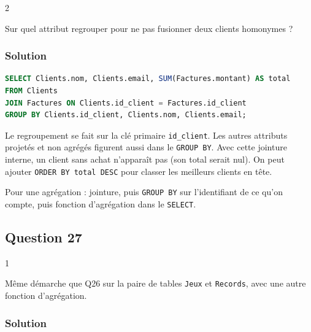 \documentclass[11pt,a4paper]{article}
\begin{document}
\begin{indication}{2}

Sur quel attribut regrouper pour ne pas fusionner deux clients homonymes ?

\end{indication}

\hypertarget{solution-25}{%
\subsubsection{Solution}\label{solution-25}}

\begin{lstlisting}[language=SQL]
SELECT Clients.nom, Clients.email, SUM(Factures.montant) AS total
FROM Clients
JOIN Factures ON Clients.id_client = Factures.id_client
GROUP BY Clients.id_client, Clients.nom, Clients.email;
\end{lstlisting}

Le regroupement se fait sur la clé primaire \texttt{id\_client}. Les autres attributs projetés et non agrégés figurent aussi dans le \texttt{GROUP\ BY}. Avec cette jointure interne, un client sans achat n'apparaît pas (son total serait nul). On peut ajouter \texttt{ORDER\ BY\ total\ DESC} pour classer les meilleurs clients en tête.

\begin{methode}

Pour une agrégation : jointure, puis \texttt{GROUP\ BY} sur l'identifiant de ce qu'on compte, puis fonction d'agrégation dans le \texttt{SELECT}.

\end{methode}

\hypertarget{question-27}{%
\subsection{Question 27}\label{question-27}}

\begin{indication}{1}

Même démarche que Q26 sur la paire de tables \texttt{Jeux} et \texttt{Records}, avec une autre fonction d'agrégation.

\end{indication}

\hypertarget{solution-26}{%
\subsubsection{Solution}\label{solution-26}}
\end{document}
